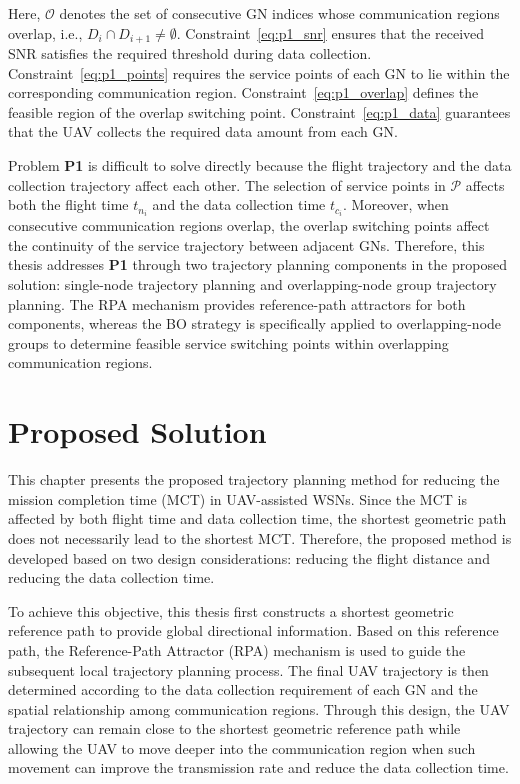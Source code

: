 \documentclass[12pt]{ksthesis}
\begin{document}
\begin{thesis}
{    Here, \(\mathcal{O}\) denotes the set of consecutive GN indices whose communication regions overlap, i.e., \(D_i \cap D_{i+1} \neq \emptyset\). Constraint~\eqref{eq:p1_snr} ensures that the received SNR satisfies the required threshold during data collection. Constraint~\eqref{eq:p1_points} requires the service points of each GN to lie within the corresponding communication region. Constraint~\eqref{eq:p1_overlap} defines the feasible region of the overlap switching point. Constraint~\eqref{eq:p1_data} guarantees that the UAV collects the required data amount from each GN.

   Problem \textbf{P1} is difficult to solve directly because the flight trajectory and the data collection trajectory affect each other. The selection of service points in \(\mathcal{P}\) affects both the flight time \(t_{n_i}\) and the data collection time \(t_{c_i}\). Moreover, when consecutive communication regions overlap, the overlap switching points affect the continuity of the service trajectory between adjacent GNs. Therefore, this thesis addresses \textbf{P1} through two trajectory planning components in the proposed solution: single-node trajectory planning and overlapping-node group trajectory planning. The RPA mechanism provides reference-path attractors for both components, whereas the BO strategy is specifically applied to overlapping-node groups to determine feasible service switching points within overlapping communication regions.

\chapter{Proposed Solution}\label{Chap:Proposed Solution}
	
    This chapter presents the proposed trajectory planning method for reducing the mission completion time (MCT) in UAV-assisted WSNs. Since the MCT is affected by both flight time and data collection time, the shortest geometric path does not necessarily lead to the shortest MCT. Therefore, the proposed method is developed based on two design considerations: reducing the flight distance and reducing the data collection time.

    To achieve this objective, this thesis first constructs a shortest geometric reference path to provide global directional information. Based on this reference path, the Reference-Path Attractor (RPA) mechanism is used to guide the subsequent local trajectory planning process. The final UAV trajectory is then determined according to the data collection requirement of each GN and the spatial relationship among communication regions. Through this design, the UAV trajectory can remain close to the shortest geometric reference path while allowing the UAV to move deeper into the communication region when such movement can improve the transmission rate and reduce the data collection time.

}
\end{thesis}
\end{document}

